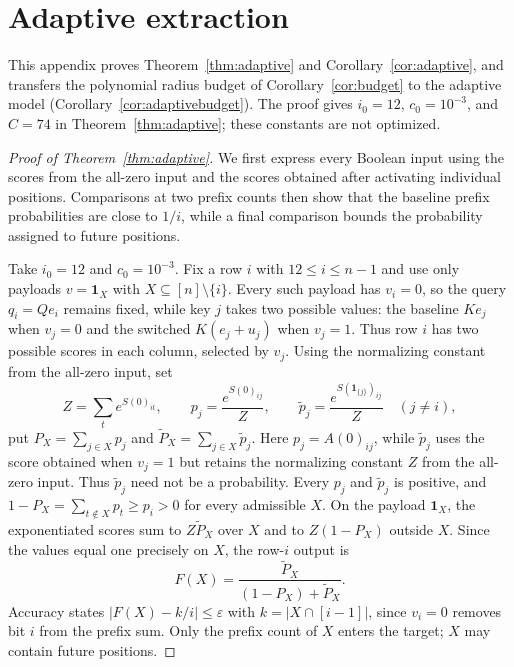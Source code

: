 \documentclass[10pt]{article} %
\theoremstyle{definition}
\newcommand{\one}{\mathbf 1}
\begin{document}
\section{Adaptive extraction}\label{app:adaptive}

This appendix proves Theorem~\ref{thm:adaptive} and
Corollary~\ref{cor:adaptive}, and transfers the polynomial radius budget of
Corollary~\ref{cor:budget} to the adaptive model
(Corollary~\ref{cor:adaptivebudget}).  The proof gives
\(i_0=12\), \(c_0=10^{-3}\), and \(C=74\) in
Theorem~\ref{thm:adaptive}; these constants are not optimized.

\begin{proof}[Proof of Theorem~\ref{thm:adaptive}]
We first express every Boolean input using the scores from the all-zero input
and the scores obtained after activating individual positions.  Comparisons
at two prefix counts then show that the baseline prefix probabilities are
close to \(1/i\), while a final comparison bounds the probability assigned to
future positions.

Take \(i_0=12\) and \(c_0=10^{-3}\).  Fix a row \(i\) with
\(12\le i\le n-1\) and use only payloads
\(v=\one_X\) with \(X\subseteq[n]\setminus\{i\}\).  Every such payload has
\(v_i=0\), so the query \(q_i=Qe_i\) remains fixed, while key \(j\) takes
two possible values: the baseline \(Ke_j\) when \(v_j=0\) and the switched
\(K(e_j+u_j)\) when \(v_j=1\).  Thus row \(i\) has two possible scores in
each column, selected by \(v_j\).  Using the normalizing constant from the
all-zero input, set
\[
 Z=\sum_t e^{S(0)_{it}},\qquad
 p_j=\frac{e^{S(0)_{ij}}}{Z},\qquad
 \tilde p_j=\frac{e^{S(\one_{\{j\}})_{ij}}}{Z}\quad(j\ne i),
\]
put \(P_X=\sum_{j\in X}p_j\) and \(\widetilde P_X=\sum_{j\in X}\tilde p_j\).
Here \(p_j=A(0)_{ij}\), while \(\tilde p_j\) uses the score obtained when
\(v_j=1\) but retains the normalizing constant \(Z\) from the all-zero input.
Thus \(\tilde p_j\) need not be a probability.  Every \(p_j\) and
\(\tilde p_j\) is positive, and
\(1-P_X=\sum_{t\notin X}p_t\ge p_i>0\) for every admissible \(X\).
On the payload \(\one_X\), the exponentiated scores sum to
\(Z\widetilde P_X\) over \(X\) and to \(Z(1-P_X)\) outside \(X\).
Since the values equal one precisely on \(X\), the row-\(i\) output is
\begin{equation}\label{eq:face}
 F(X)=\frac{\widetilde P_X}{(1-P_X)+\widetilde P_X}.
\end{equation}
Accuracy states \(|F(X)-k/i|\le\varepsilon\) with
\(k=|X\cap[i-1]|\), since \(v_i=0\) removes bit \(i\) from the prefix
sum.  Only the prefix count of \(X\) enters the target; \(X\) may
contain future positions.


\end{proof}
\end{document}
